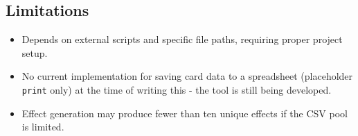 \subsection{Limitations}
\begin{itemize}
	\item Depends on external scripts and specific file paths, requiring proper project setup.
	\item No current implementation for saving card data to a spreadsheet (placeholder \texttt{print} only) at the time of writing this - the tool is still being developed.
	\item Effect generation may produce fewer than ten unique effects if the CSV pool is limited.
\end{itemize}